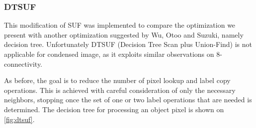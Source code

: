 \documentclass[hidelinks]{llncs}
\newcommand{\texten}[1]{#1}
\newcommand{\textru}[1]{}
\begin{document}
\subsubsection{DTSUF}

\texten{
This modification of SUF was implemented to compare the optimization we present with
another optimization suggested by Wu, Otoo and Suzuki\cite{wuotoo},
namely decision tree.
Unfortunately DTSUF (Decision Tree Scan plus Union-Find) is not applicable for
condensed image, as it exploits similar observations on 8-connectivity.
}\textru{
Эта модификация SUF была добавлена чтобы сравнить нашу оптимизацию с
одной из оптимизаций, предложенных Wu, Otoo и Suzuki\cite{wuotoo}, а именно с
деревом принятия решения.
К сожалению, DTSUF (Decision Tree Scan with Union-Find) не применим для сжатого
изображения, так как использует свойства 8-связности, которыми наша новая
связность не обладает.
}

\texten{
As before, the goal is to reduce the number of pixel lookup and label copy operations.
This is achieved with careful consideration of only the necessary neighbors,
stopping once the set of one or two label operations that are needed is
determined. The decision tree for processing an object pixel is
shown on \autoref{fig:dtsuf}.
}\textru{
Как и раньше, цель состоит в том, чтобы уменьшить число запросов на содержание
пикселя и копирований меток.
Это достигается аккуратным рассмотрением соседей в оптимальном порядке и
остановкой рассмотрения, как только достаточная для выполнения всех необоходимых
действий информация была получена.
Смотри дерево на \autoref{fig:dtsuf}.
}
\end{document}
